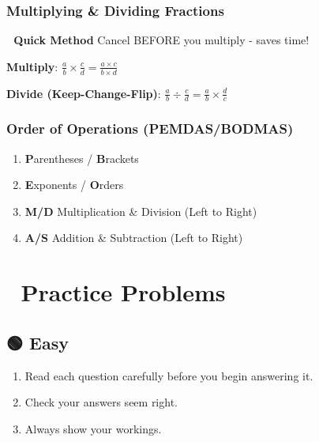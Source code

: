 \documentclass[
  letterpaper,
  DIV=11,
  numbers=noendperiod]{scrreprt}
\providecommand{\tightlist}{%
  \setlength{\itemsep}{0pt}\setlength{\parskip}{0pt}}
\theoremstyle{definition}
\theoremstyle{remark}
\begin{document}
\subsubsection*{Multiplying \& Dividing
Fractions}\label{multiplying-dividing-fractions}

\textbf{📝 Quick Method} Cancel BEFORE you multiply - saves time!

\textbf{Multiply}:
\(\frac{a}{b} \times \frac{c}{d} = \frac{a \times c}{b \times d}\)

\textbf{Divide (Keep-Change-Flip)}:
\(\frac{a}{b} \div \frac{c}{d} = \frac{a}{b} \times \frac{d}{c}\)

\subsubsection*{Order of Operations
(PEMDAS/BODMAS)}\label{order-of-operations-pemdasbodmas}

\begin{enumerate}
\def\labelenumi{\arabic{enumi}.}
\tightlist
\item
  \textbf{P}arentheses / \textbf{B}rackets
\item
  \textbf{E}xponents / \textbf{O}rders
\item
  \textbf{M/D} Multiplication \& Division (Left to Right)
\item
  \textbf{A/S} Addition \& Subtraction (Left to Right)
\end{enumerate}

\section{📝 Practice Problems}\label{practice-problems}

\subsection{🟢 Easy}

\begin{tcolorbox}[enhanced jigsaw, opacitybacktitle=0.6, coltitle=black, arc=.35mm, colframe=quarto-callout-important-color-frame, colback=white, bottomrule=.15mm, left=2mm, colbacktitle=quarto-callout-important-color!10!white, titlerule=0mm, opacityback=0, title={Guidance}, leftrule=.75mm, breakable, rightrule=.15mm, bottomtitle=1mm, toptitle=1mm, toprule=.15mm]

\begin{enumerate}
\def\labelenumi{\arabic{enumi}.}
\tightlist
\item
  Read each question carefully before you begin answering it.
\item
  Check your answers seem right.
\item
  Always show your workings.
\end{enumerate}

\end{tcolorbox}
\end{document}
